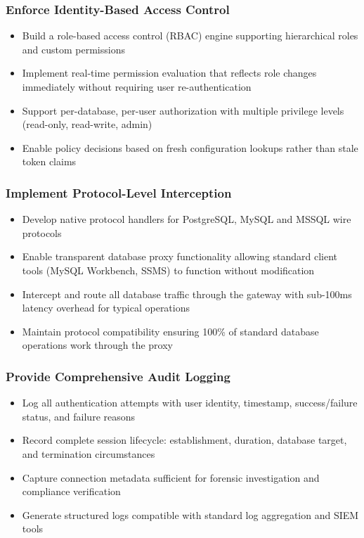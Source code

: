 \subsubsection{Enforce Identity-Based Access Control}
\begin{itemize}
    \item Build a role-based access control (RBAC) engine supporting hierarchical roles and custom permissions
    \item Implement real-time permission evaluation that reflects role changes immediately without requiring user re-authentication
    \item Support per-database, per-user authorization with multiple privilege levels (read-only, read-write, admin)
    \item Enable policy decisions based on fresh configuration lookups rather than stale token claims
\end{itemize}

\subsubsection{Implement Protocol-Level Interception}
\begin{itemize}
    \item Develop native protocol handlers for PostgreSQL, MySQL and MSSQL wire protocols
    \item Enable transparent database proxy functionality allowing standard client tools (MySQL Workbench, SSMS) to function without modification
    \item Intercept and route all database traffic through the gateway with sub-100ms latency overhead for typical operations
    \item Maintain protocol compatibility ensuring 100\% of standard database operations work through the proxy
\end{itemize}

\subsubsection{Provide Comprehensive Audit Logging}
\begin{itemize}
    \item Log all authentication attempts with user identity, timestamp, success/failure status, and failure reasons
    \item Record complete session lifecycle: establishment, duration, database target, and termination circumstances
    \item Capture connection metadata sufficient for forensic investigation and compliance verification
    \item Generate structured logs compatible with standard log aggregation and SIEM tools
\end{itemize}

